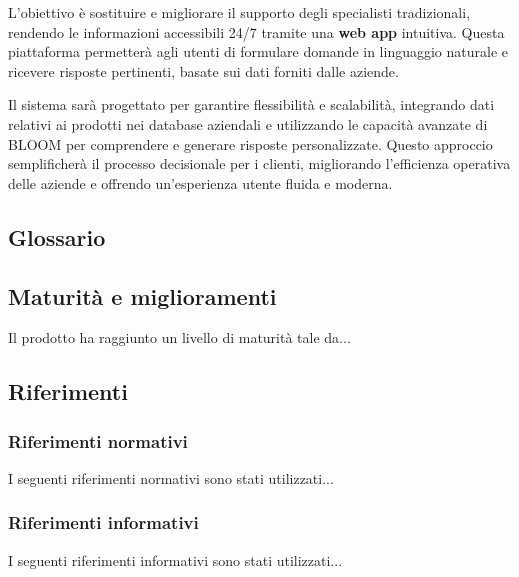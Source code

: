 L’obiettivo è sostituire e migliorare il supporto degli specialisti tradizionali, 
rendendo le informazioni accessibili 24/7 tramite una \textbf{web app} intuitiva. 
Questa piattaforma permetterà agli utenti di formulare domande in linguaggio naturale 
e ricevere risposte pertinenti, basate sui dati forniti dalle aziende. 

Il sistema sarà progettato per garantire flessibilità e scalabilità, 
integrando dati relativi ai prodotti nei database aziendali e utilizzando 
le capacità avanzate di BLOOM per comprendere e generare risposte personalizzate. 
Questo approccio semplificherà il processo decisionale per i clienti, 
migliorando l’efficienza operativa delle aziende e offrendo 
un’esperienza utente fluida e moderna.

\subsection{Glossario}


\subsection{Maturità e miglioramenti}
Il prodotto ha raggiunto un livello di maturità tale da...

\subsection{Riferimenti}

\subsubsection{Riferimenti normativi}
I seguenti riferimenti normativi sono stati utilizzati...

\subsubsection{Riferimenti informativi}
I seguenti riferimenti informativi sono stati utilizzati...
